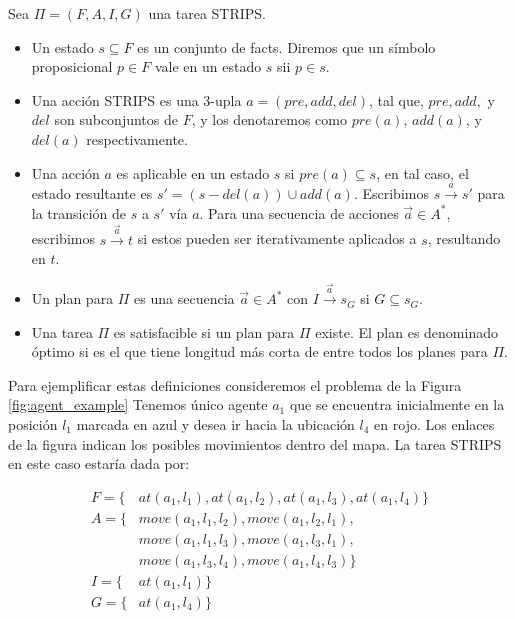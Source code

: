 \begin{mydef}
    Sea $\Pi = (F, A, I, G)$ una tarea STRIPS.
    
    \begin{itemize}
        \item Un estado $s \subseteq F$ es un conjunto de facts. Diremos que un
        símbolo proposicional $p \in F$ vale en un estado $s$ sii $p \in s$.
        
        \item Una acción STRIPS es una 3-upla $a = (pre, add, del)$, tal que,
        $pre, add,$ y $del$ son subconjuntos de $F$, y los denotaremos como
        $pre(a)$, $add(a)$, y $del(a)$ respectivamente.

        \item Una acción $a$ es aplicable en un estado $s$ si $pre(a) \subseteq
        s$, en tal caso, el estado resultante es $s' = (s - del(a)) \cup
        add(a)$. Escribimos $s \xrightarrow{a} s'$ para la transición de $s$ a
        $s'$ vía $a$. Para una secuencia de acciones $\vec{a} \in A^{*}$, escribimos $s
        \xrightarrow{\vec{a}} t$ si estos pueden ser iterativamente aplicados a
        $s$, resultando en $t$.

        \item Un plan para $\Pi$ es una secuencia $\vec{a} \in A^{*}$ con $I
        \xrightarrow{\vec{a}} s_G$ si $G \subseteq s_G$.
        
        \item Una tarea $\Pi$ es satisfacible si un plan para $\Pi$ existe. El
        plan es denominado óptimo si es el que tiene longitud más corta de entre
        todos los planes para $\Pi$.
    \end{itemize}
\end{mydef}

Para ejemplificar estas definiciones consideremos el problema de la Figura
\ref{fig:agent_example} Tenemos único agente $a_1$ que se encuentra inicialmente
en la posición $l_1$ marcada en azul y desea ir hacia la ubicación $l_4$ en
rojo. Los enlaces de la figura indican los posibles movimientos dentro del mapa.
La tarea STRIPS en este caso estaría dada por:

\begin{align*}
    F = \{&at(a_1, l_1), at(a_1, l_2), at(a_1, l_3), at(a_1, l_4)\} \\
    A = \{&move(a_1, l_1, l_2), move(a_1, l_2, l_1), \\
    & move(a_1, l_1, l_3), move(a_1, l_3, l_1),\\
    & move(a_1, l_3, l_4), move(a_1, l_4, l_3)\} \\
    I = \{&at(a_1, l_1)\} \\
    G = \{&at(a_1, l_4)\}
\end{align*}

